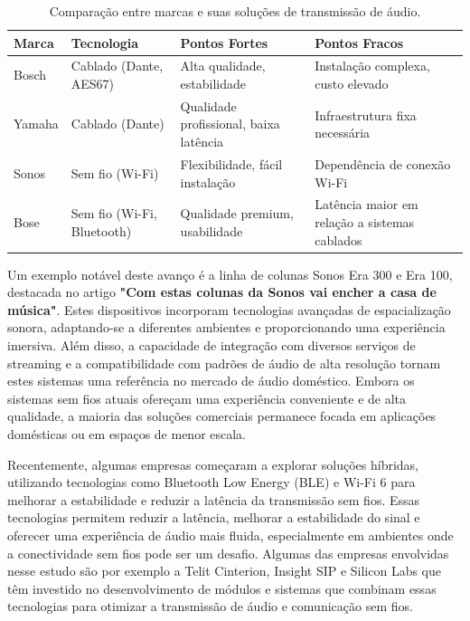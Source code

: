 \documentclass{article}
\begin{document}
\begin{table}[h]
    \centering
    \begin{tabular}{@{}l p{3cm} p{3cm} p{3cm}@{}}
 
        \toprule
        \textbf{Marca} & \textbf{Tecnologia} & \textbf{Pontos Fortes} & \textbf{Pontos Fracos} \\
        \midrule
        Bosch & Cablado (Dante, AES67) & Alta qualidade, estabilidade & Instalação complexa, custo elevado \\
        Yamaha & Cablado (Dante) & Qualidade profissional, baixa latência & Infraestrutura fixa necessária \\
        Sonos & Sem fio (Wi-Fi) & Flexibilidade, fácil instalação & Dependência de conexão Wi-Fi \\
        Bose & Sem fio (Wi-Fi, Bluetooth) & Qualidade premium, usabilidade & Latência maior em relação a sistemas cablados \\
        \bottomrule
    \end{tabular}
    \caption{Comparação entre marcas e suas soluções de transmissão de áudio.}
    \label{tab:comparacao_marcas}
\end{table}




Um exemplo notável deste avanço é a linha de colunas Sonos Era 300 e Era 100, destacada no artigo \textbf{"Com estas colunas da Sonos vai encher a casa de música"}. Estes dispositivos incorporam tecnologias avançadas de espacialização sonora, adaptando-se a diferentes ambientes e proporcionando uma experiência imersiva. Além disso, a capacidade de integração com diversos serviços de streaming e a compatibilidade com padrões de áudio de alta resolução tornam estes sistemas uma referência no mercado de áudio doméstico.
Embora os sistemas sem fios atuais ofereçam uma experiência conveniente e de alta qualidade, a maioria das soluções comerciais permanece focada em aplicações domésticas ou em espaços de menor escala. 


Recentemente, algumas empresas começaram a explorar soluções híbridas, utilizando tecnologias como Bluetooth Low Energy (BLE) e Wi-Fi 6 para melhorar a estabilidade e reduzir a latência da transmissão sem fios. Essas tecnologias permitem reduzir a latência, melhorar a estabilidade do sinal e oferecer uma experiência de áudio mais fluida, especialmente em ambientes onde a conectividade sem fios pode ser um desafio. Algumas das empresas envolvidas nesse estudo são por exemplo a Telit Cinterion, Insight SIP e Silicon Labs que têm investido no desenvolvimento de módulos e sistemas que combinam essas tecnologias para otimizar a transmissão de áudio e comunicação sem fios. 
\end{document}
